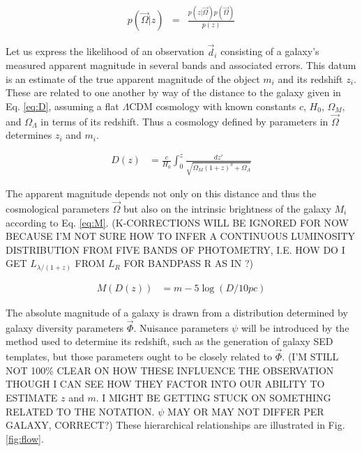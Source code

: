 \documentclass[12pt, onecolumn]{emulateapj}
\begin{document}
\begin{eqnarray}
\label{eq:bayes}
p(\vec{\Omega}|z) &=& \frac{p(z|\vec{\Omega})p(\vec{\Omega})}{p(z)}
\end{eqnarray}

Let us express the likelihood of an observation $\vec{d}_{i}$ consisting of a galaxy's measured apparent magnitude in several bands and associated errors.  This datum is an estimate of the true apparent magnitude of the object $m_{i}$ and its redshift $z_{i}$.  These are related to one another by way of the distance to the galaxy given in Eq. \ref{eq:D}, assuming a flat $\Lambda$CDM cosmology with known constants $c$, $H_{0}$, $\Omega_{M}$, and $\Omega_{\Lambda}$ in terms of its redshift.  Thus a cosmology defined by parameters in $\vec{\Omega}$ determines $z_{i}$ and $m_{i}$.   

\begin{eqnarray}
\label{eq:D}
D(z) &= \frac{c}{H_{0}}\int_{0}^{z}\frac{dz'}{\sqrt{\Omega_{M}(1+z)^{3}+\Omega_{\Lambda}}}
\end{eqnarray}

The apparent magnitude depends not only on this distance and thus the cosmological parameters $\vec{\Omega}$ but also on the intrinsic brightness of the galaxy $M_{i}$ according to Eq. \ref{eq:M}.   (K-CORRECTIONS WILL BE IGNORED FOR NOW BECAUSE I'M NOT SURE HOW TO INFER A CONTINUOUS LUMINOSITY DISTRIBUTION FROM FIVE BANDS OF PHOTOMETRY, I.E. HOW DO I GET $L_{\lambda/(1+z)}$ FROM $L_{R}$ FOR BANDPASS R AS IN \citet{hog99}?)

\begin{eqnarray}
\label{eq:M}
M(D(z)) &= m-5\log(D/10pc)
\end{eqnarray}

The absolute magnitude of a galaxy is drawn from a distribution determined by galaxy diversity parameters $\vec{\Phi}$.  Nuisance parameters $\psi$ will be introduced by the method used to determine its redshift, such as the generation of galaxy SED templates, but those parameters ought to be closely related to $\vec{\Phi}$.  (I'M STILL NOT 100\% CLEAR ON HOW THESE INFLUENCE THE OBSERVATION THOUGH I CAN SEE HOW THEY FACTOR INTO OUR ABILITY TO ESTIMATE $z$ and $m$.  I MIGHT BE GETTING STUCK ON SOMETHING RELATED TO THE NOTATION.  $\psi$ MAY OR MAY NOT DIFFER PER GALAXY, CORRECT?)  These hierarchical relationships are illustrated in Fig. \ref{fig:flow}.  

\end{document}
